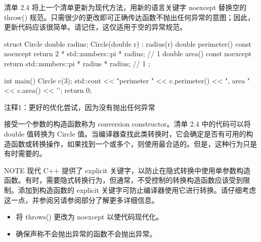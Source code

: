 
清单 2.4 将上一个清单更新为现代方法，用新的语言关键字 noexcept 替换空的 throw() 规范。只需很少的更改即可正确传达函数不抛出任何异常的意图；因此，更新代码应该很简单。请记住，这仅适用于空的异常规范。

\begin{cpp}
struct Circle {
  double radius;
  Circle(double r) : radius(r) {}
  double perimeter() const noexcept { return 2 * std::numbers::pi * radius; } // 1
  double area() const noexcept { return std::numbers::pi * radius * radius; } // 1
};

int main() {
  Circle c(3);
  std::cout << "perimeter " << c.perimeter() << ", area " << c.area() << '\n';
  return 0;
}
\end{cpp}

{\footnotesize
注释1：更好的优化尝试，因为没有抛出任何异常
}

接受一个参数的构造函数称为 conversion constructor。清单 2.4 中的代码可以将 double 值转换为 Circle 值。当编译器查找此类转换时，它会确定是否有可用的构造函数或转换操作，如果找到一个或多个，则使用最合适的。但是，这种行为只是有时需要的。

\begin{myNotic}{NOTE}
现代 C++ 提供了 explicit 关键字，以防止在隐式转换中使用单参数构造函数。有时，需要隐式转换行为，但通常，不受控制的转换构造函数应该受到限制。添加到构造函数的 explicit 关键字可防止编译器使用它进行转换。请仔细考虑这一点，并参阅另请参阅部分了解更多详细信息。
\end{myNotic}


\begin{itemize}
\item
将 throws() 更改为 noexcept 以使代码现代化。

\item
确保声称不会抛出异常的函数不会抛出异常。
\end{itemize}











